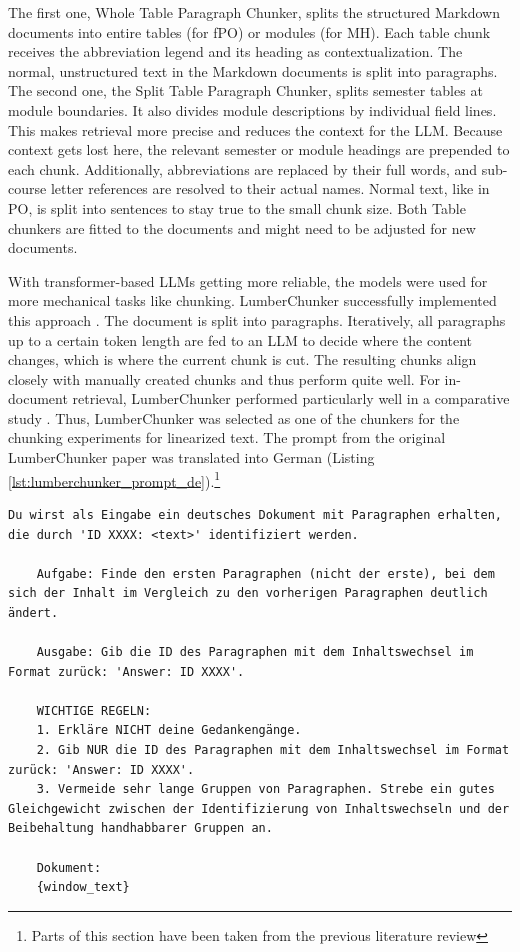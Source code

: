 \documentclass[12pt]{article} %
\begin{document}
The first one, Whole Table Paragraph Chunker, splits the structured Markdown documents into entire tables (for fPO) or modules (for MH). Each table chunk receives the abbreviation legend and its heading as contextualization. The normal, unstructured text in the Markdown documents is split into paragraphs. The second one, the Split Table Paragraph Chunker, splits semester tables at module boundaries. It also divides module descriptions by individual field lines. This makes retrieval more precise and reduces the context for the LLM. Because context gets lost here, the relevant semester or module headings are prepended to each chunk. Additionally, abbreviations are replaced by their full words, and sub-course letter references are resolved to their actual names. Normal text, like in PO, is split into sentences to stay true to the small chunk size. Both Table chunkers are fitted to the documents and might need to be adjusted for new documents.

With transformer-based LLMs getting more reliable, the models were used for more mechanical tasks like chunking. LumberChunker successfully implemented this approach \parencite{duarte2024lumberchunker}. The document is split into paragraphs. Iteratively, all paragraphs up to a certain token length are fed to an LLM to decide where the content changes, which is where the current chunk is cut. The resulting chunks align closely with manually created chunks and thus perform quite well. For in-document retrieval, LumberChunker performed particularly well in a comparative study \parencite{zhou2026beyond}. Thus, LumberChunker was selected as one of the chunkers for the chunking experiments for linearized text. The prompt from the original LumberChunker paper was translated into German (Listing \ref{lst:lumberchunker_prompt_de}).\footnote{Parts of this section have been taken from the previous literature review}
\begin{lstlisting}[breaklines=true, basicstyle=\ttfamily, label=lst:lumberchunker_prompt_de, caption={LumberChunker translated Prompt},]
    Du wirst als Eingabe ein deutsches Dokument mit Paragraphen erhalten, die durch 'ID XXXX: <text>' identifiziert werden.

    Aufgabe: Finde den ersten Paragraphen (nicht der erste), bei dem sich der Inhalt im Vergleich zu den vorherigen Paragraphen deutlich ändert.

    Ausgabe: Gib die ID des Paragraphen mit dem Inhaltswechsel im Format zurück: 'Answer: ID XXXX'.

    WICHTIGE REGELN:
    1. Erkläre NICHT deine Gedankengänge.
    2. Gib NUR die ID des Paragraphen mit dem Inhaltswechsel im Format zurück: 'Answer: ID XXXX'.
    3. Vermeide sehr lange Gruppen von Paragraphen. Strebe ein gutes Gleichgewicht zwischen der Identifizierung von Inhaltswechseln und der Beibehaltung handhabbarer Gruppen an.

    Dokument:
    {window_text}
\end{lstlisting}
\end{document}
